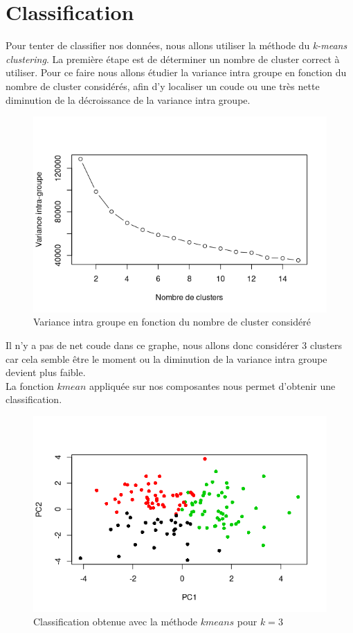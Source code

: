\documentclass[11pt]{article}
\begin{document}
\section{Classification}
Pour tenter de classifier nos données, nous allons utiliser la méthode du \emph{k-means clustering}.
La première étape est de déterminer un nombre de cluster correct à utiliser. Pour ce faire nous allons étudier la variance intra groupe en fonction du nombre de cluster considérés, afin d'y localiser un coude ou une très nette diminution de la décroissance de la variance intra groupe.
\begin{figure}[H]
\centering
\includegraphics[scale=1]{nclust.png}
\caption{Variance intra groupe en fonction du nombre de cluster considéré}
\end{figure}
\noindent Il n'y a pas de net coude dans ce graphe, nous allons donc considérer 3 clusters car cela semble être le moment ou la diminution de la variance intra groupe devient plus faible.\\
La fonction $kmean$ appliquée sur nos composantes nous permet d'obtenir une classification.
\begin{figure}[H]
\centering
\includegraphics[scale=1]{class.png}
\caption{Classification obtenue avec la méthode $kmeans$ pour $k=3$}
\end{figure}
\end{document}
